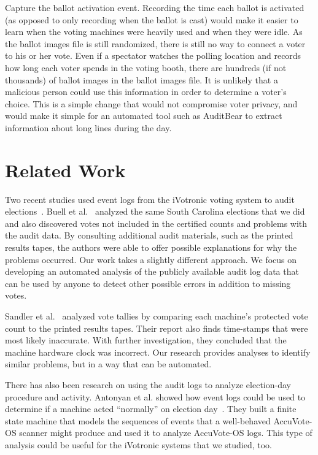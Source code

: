 \documentclass[letterpaper,twocolumn,10pt]{article}
\begin{document}
Capture the ballot activation event. Recording the time each ballot is activated
(as opposed to only recording when the ballot is cast) would make it easier to
learn when the voting machines were heavily used and when they were idle. As the 
ballot images file is still randomized, there is still no way to connect a voter 
to his or her vote.  Even if a spectator watches the polling location and records 
how long each voter spends in the voting booth, there are hundreds (if not thousands) 
of ballot images in the ballot images file.  It is unlikely that a malicious person 
could use this information in order to determine a voter's choice.  This
is a simple change that would not compromise voter privacy, and would make it
simple for an automated tool such as AuditBear to extract information
about long lines during the day.
 
 \section{Related Work}
Two recent studies used event logs from the iVotronic voting system to audit
elections~\cite{Buell2011, Sandler2007}. Buell et al.~\cite{Buell2011} analyzed
the same South Carolina elections that we did and also discovered votes not
included in the certified counts and problems with the audit data. By consulting
additional audit materials, such as the printed results tapes, the authors were
able to offer possible explanations for why the problems occurred. Our work
takes a slightly different approach. We focus on developing an automated
analysis of the publicly available audit log data that can be used by
anyone to detect other possible errors in addition to missing votes.   

Sandler et al.~\cite{Sandler2007} analyzed vote tallies by comparing each
machine's protected vote count to the printed results tapes. Their report also
finds time-stamps that were most likely inaccurate. With further investigation,
they concluded that the machine hardware clock was incorrect. Our research
provides analyses to identify similar problems, but in a way that can be
automated.   

There has also been research on using the audit logs to analyze election-day
procedure and activity. Antonyan et al. showed how event logs could be used to
determine if a machine acted ``normally'' on election
day~\cite{Antonyan2009}. They built a finite state machine that models the
sequences of events that a well-behaved AccuVote-OS scanner might produce and
used it to analyze AccuVote-OS logs. This type of analysis could be useful for
the iVotronic systems that we studied, too.  
\end{document}
